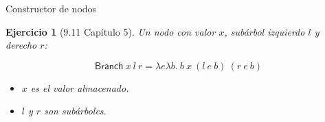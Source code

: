 \documentclass[11pt]{beamer}
\newtheorem{exercise}{Ejercicio}
\begin{document}
\begin{frame}{Constructor de nodos}
	\begin{exercise}[9.11 Capítulo 5]
		Un nodo con valor $x$, subárbol izquierdo $l$ y derecho $r$:
		
		\[
		\textsf{Branch}\ x\ l\ r = \lambda e\lambda b.\ b\ x\ (l\ e\ b)\ (r\ e\ b)
		\]
		
		\begin{itemize}
			\item $x$ es el valor almacenado.
			\item $l$ y $r$ son subárboles.
		\end{itemize}
		
		
		
%		
%		
%		
%		

	\end{exercise}
\end{frame}
\end{document}
